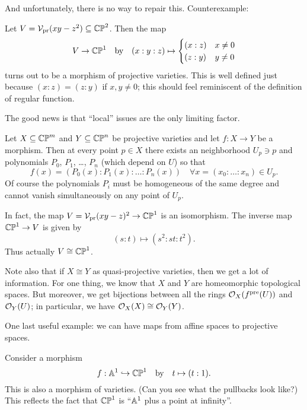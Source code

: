 And unfortunately, there is no way to repair this.
Counterexample:
\begin{example}
	Let $V = \mathcal V_{\text{pr}}(xy-z^2) \subseteq \mathbb{CP}^2$.
	Then the map
	\[
		V \to \mathbb{CP}^1
		\quad\text{by}\quad
		(x:y:z)
		\mapsto
		\begin{cases}
			(x:z) & x \neq 0 \\
			(z:y) & y \neq 0
		\end{cases}
	\]
	turns out to be a morphism of projective varieties.
	This is well defined just because $(x:z) = (z:y)$ if $x,y \neq 0$;
	this should feel reminiscent of the definition of regular function.
\end{example}
The good news is that ``local'' issues are the only limiting factor.
\begin{theorem}
	Let $X \subseteq \mathbb{CP}^m$ and $Y \subseteq \mathbb{CP}^n$ be projective varieties
	and let $f : X \to Y$ be a morphism.
	Then at every point $p \in X$ there exists an neighborhood $U_p \ni p$
	and polynomials $P_0$, $P_1$, \dots, $P_n$ (which depend on $U$) so that
	\[ f(x) = \left( P_0(x) : P_1(x) : \dots : P_n(x) \right)
		\quad \forall x = (x_0 : \dots : x_n) \in U_p. \]
	Of course the polynomials $P_i$ must be homogeneous of the same degree
	and cannot vanish simultaneously on any point of $U_p$.
\end{theorem}
\begin{example}
	In fact, the map $V = \mathcal V_{\text{pr}}(xy-z)^2 \to \mathbb{CP}^1$ is an isomorphism.
	The inverse map $\mathbb{CP}^1 \to V$ is given by 
	\[ (s:t) \mapsto (s^2:st:t^2). \]
	Thus actually $V \cong \mathbb{CP}^1$.
\end{example}

\begin{remark}
Note also that if $X \cong Y$ as quasi-projective varieties,
then we get a lot of information.
For one thing, we know that $X$ and $Y$ are homeomorphic topological spaces.
But moreover, we get bijections between all the rings $\mathcal O_X(f^{\text{pre}}(U))$
and $\mathcal O_Y(U)$; in particular, we have $\mathcal O_X(X) \cong \mathcal O_Y(Y)$.
\end{remark}

One last useful example:
we can have maps from affine spaces to projective spaces.
\begin{example}
	Consider a morphism
	\[ f : \mathbb A^1 \hookrightarrow \mathbb{CP}^1 \quad\text{by}\quad t \mapsto (t:1).  \]
	This is also a morphism of varieties.
	(Can you see what the pullbacks look like?)
	This reflects the fact that $\mathbb{CP}^1$ is ``$\mathbb A^1$ plus a point at infinity''.
\end{example}

